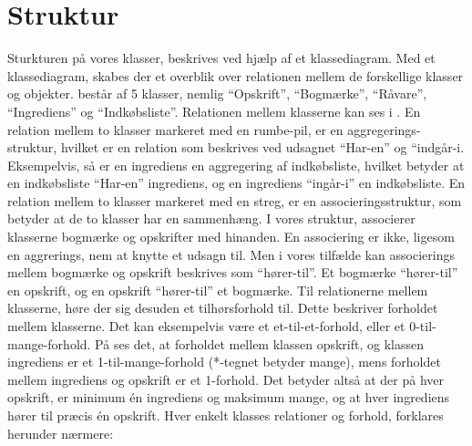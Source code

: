 \section{Struktur}
\label{sec:struktur}

Sturkturen på vores klasser, beskrives ved hjælp af et klassediagram. Med et klassediagram, skabes der et overblik over relationen mellem de forskellige klasser og objekter. \Foodl består af 5 klasser, nemlig ``Opskrift'', ``Bogmærke'', ``Råvare'', ``Ingrediens'' og ``Indkøbsliste''. Relationen mellem klasserne kan ses i . En relation mellem to klasser markeret med en rumbe-pil, er en aggregerings-struktur, hvilket er en relation som beskrives ved udsagnet ``Har-en'' og ``indgår-i. Eksempelvis, så er en ingrediens en aggregering af indkøbsliste, hvilket betyder at en indkøbsliste ``Har-en'' ingrediens, og en ingrediens ``ingår-i'' en indkøbsliste. En relation mellem to klasser markeret med en streg, er en associeringsstruktur, som betyder at de to klasser har en sammenhæng. I vores struktur, associerer klasserne bogmærke og opskrifter med hinanden. En associering er ikke, ligesom en aggrerings, nem at knytte et udsagn til. Men i vores tilfælde kan associerings mellem bogmærke og opskrift beskrives som ``hører-til''. Et bogmærke ``hører-til'' en opskrift, og en opskrift ``hører-til'' et bogmærke. Til relationerne mellem klasserne, høre der sig desuden et tilhørsforhold til. Dette beskriver forholdet mellem klasserne. Det kan eksempelvis være et et-til-et-forhold, eller et 0-til-mange-forhold. På  ses det, at forholdet mellem klassen opskrift, og klassen ingrediens er et 1-til-mange-forhold (*-tegnet betyder mange), mens forholdet mellem ingrediens og opskrift er et 1-forhold. Det betyder altså at der på hver opskrift, er minimum én ingrediens og maksimum mange, og at hver ingrediens hører til præcis én opskrift. Hver enkelt klasses relationer og forhold, forklares herunder nærmere:



